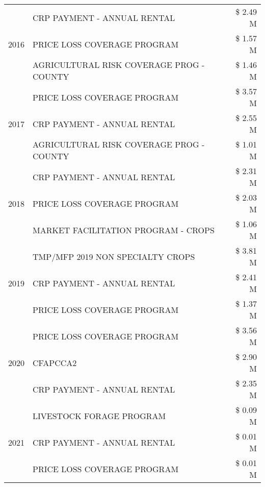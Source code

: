 \begin{tabular}{llr}
\multirow[t]{3}{*}{2016} & CRP PAYMENT - ANNUAL RENTAL & \$ 2.49 M \\
 & PRICE LOSS COVERAGE PROGRAM & \$ 1.57 M \\
 & AGRICULTURAL RISK COVERAGE PROG - COUNTY & \$ 1.46 M \\
\cline{1-3}
\multirow[t]{3}{*}{2017} & PRICE LOSS COVERAGE PROGRAM & \$ 3.57 M \\
 & CRP PAYMENT - ANNUAL RENTAL & \$ 2.55 M \\
 & AGRICULTURAL RISK COVERAGE PROG - COUNTY & \$ 1.01 M \\
\cline{1-3}
\multirow[t]{3}{*}{2018} & CRP PAYMENT - ANNUAL RENTAL & \$ 2.31 M \\
 & PRICE LOSS COVERAGE PROGRAM & \$ 2.03 M \\
 & MARKET FACILITATION PROGRAM - CROPS & \$ 1.06 M \\
\cline{1-3}
\multirow[t]{3}{*}{2019} & TMP/MFP 2019 NON SPECIALTY CROPS & \$ 3.81 M \\
 & CRP PAYMENT - ANNUAL RENTAL & \$ 2.41 M \\
 & PRICE LOSS COVERAGE PROGRAM & \$ 1.37 M \\
\cline{1-3}
\multirow[t]{3}{*}{2020} & PRICE LOSS COVERAGE PROGRAM & \$ 3.56 M \\
 & CFAPCCA2 & \$ 2.90 M \\
 & CRP PAYMENT - ANNUAL RENTAL & \$ 2.35 M \\
\cline{1-3}
\multirow[t]{3}{*}{2021} & LIVESTOCK FORAGE PROGRAM & \$ 0.09 M \\
 & CRP PAYMENT - ANNUAL RENTAL & \$ 0.01 M \\
 & PRICE LOSS COVERAGE PROGRAM & \$ 0.01 M \\
\cline{1-3}
\bottomrule
\end{tabular}
